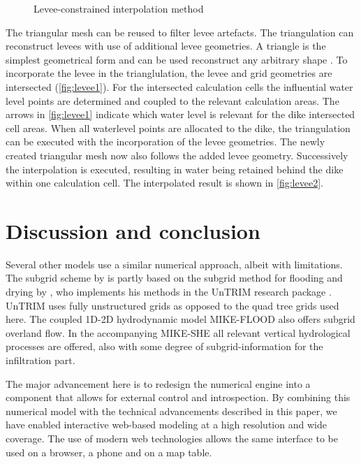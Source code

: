 \documentclass[a4paper]{article}
\begin{document}
\begin{figure}[htbp]
  \caption{Levee-constrained interpolation method}

\end{figure}

The triangular mesh can be reused to filter levee artefacts. The triangulation can reconstruct levees with use of additional levee geometries. A triangle is the simplest geometrical form and can be used reconstruct any arbitrary shape \citep{Welch1994}. To incorporate the levee in the trianglulation, the levee and grid geometries are intersected (\autoref{fig:levee1}). For the intersected calculation cells the influential water level points are determined and coupled to the relevant calculation areas. The arrows in \autoref{fig:levee1} indicate which water level is relevant for the dike intersected cell areas. When all waterlevel points are allocated to the dike, the triangulation can be executed with the incorporation of the levee geometries. The newly created triangular mesh now also follows the added levee geometry. Successively the interpolation is executed, resulting in water being retained behind the dike within one calculation cell. The interpolated result is shown in \autoref{fig:levee2}.



\section{Discussion and conclusion}
Several other models use a similar numerical approach, albeit with limitations. The subgrid scheme by \citet{Stelling2012} is partly based on the subgrid method for flooding and drying by \citet{Casulli2009}, who implements his methods in the UnTRIM research package \citet{Casulli2000}. UnTRIM uses fully unstructured grids as opposed to the quad tree grids used here. The coupled 1D-2D hydrodynamic model MIKE-FLOOD \citep{Dhi2014} also offers subgrid overland flow. In the accompanying MIKE-SHE all relevant vertical hydrological processes are offered, also with some degree of subgrid-information for the infiltration part.

The major advancement here is to redesign the numerical engine into a component that allows for external control and introspection. By combining this numerical model with the technical advancements described in this paper, we have enabled interactive web-based modeling at a high resolution and wide coverage. The use of modern web technologies allows the same interface to be used on a browser, a phone and on a map table.
\end{document}
